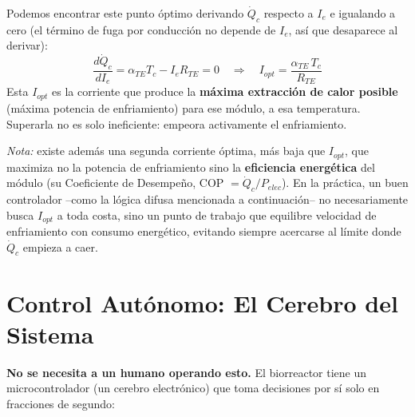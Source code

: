 \documentclass[11pt,a4paper]{article}
\begin{document}
Podemos encontrar este punto óptimo derivando $\dot{Q}_c$ respecto a $I_e$ e igualando a cero (el término de fuga por conducción no depende de $I_e$, así que desaparece al derivar):
\begin{equation}
\frac{d\dot{Q}_c}{dI_e} = \alpha_{TE} T_c - I_e R_{TE} = 0 \quad \Rightarrow \quad I_{opt} = \frac{\alpha_{TE}\, T_c}{R_{TE}}
\end{equation}
Esta $I_{opt}$ es la corriente que produce la \textbf{máxima extracción de calor posible} (máxima potencia de enfriamiento) para ese módulo, a esa temperatura. Superarla no es solo ineficiente: empeora activamente el enfriamiento.

\begin{center}
\end{center}

\textit{Nota:} existe además una segunda corriente óptima, más baja que $I_{opt}$, que maximiza no la potencia de enfriamiento sino la \textbf{eficiencia energética} del módulo (su Coeficiente de Desempeño, COP $= \dot{Q}_c / P_{elec}$). En la práctica, un buen controlador --como la lógica difusa mencionada a continuación-- no necesariamente busca $I_{opt}$ a toda costa, sino un punto de trabajo que equilibre velocidad de enfriamiento con consumo energético, evitando siempre acercarse al límite donde $\dot{Q}_c$ empieza a caer.

\section{Control Autónomo: El Cerebro del Sistema}
\textbf{No se necesita a un humano operando esto.} El biorreactor tiene un microcontrolador (un cerebro electrónico) que toma decisiones por sí solo en fracciones de segundo:
\end{document}
